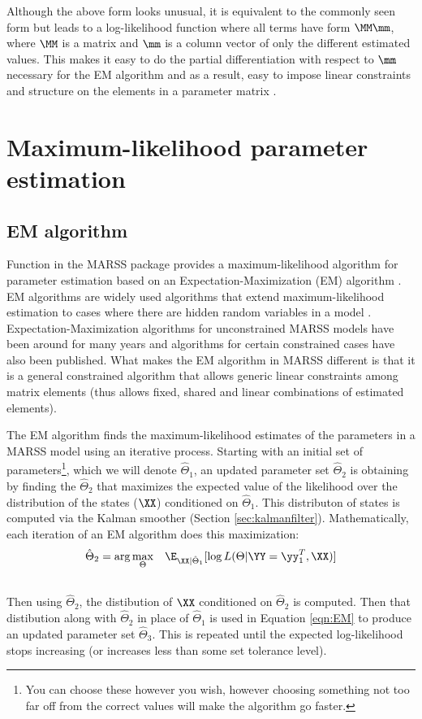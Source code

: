 Although the above form looks unusual, it is equivalent to the commonly seen form but leads to a log-likelihood function where all terms have form 
$\MM\mm$, where $\MM$ is a matrix and $\mm$ is a column vector of only the different estimated values.  This makes it easy to do the partial differentiation with respect
to $\mm$ necessary for the EM algorithm and as a result, easy to impose linear constraints and structure on the elements in a parameter matrix \citep{Holmes2010}.

\section{Maximum-likelihood parameter estimation}

\subsection{EM algorithm}

Function \verb@MARSSkem@{} in the MARSS package provides a maximum-likelihood algorithm for parameter estimation based on an Expectation-Maximization (EM) algorithm  \citep{Holmes2010}. EM algorithms are widely used algorithms that extend maximum-likelihood estimation to cases where there are hidden random variables in a model \citep{Dempsteretal1977, Harvey1989, HarveyShephard1993, McLachlanKrishnan2008}.   Expectation-Maximization algorithms for unconstrained MARSS models have been around for many years and algorithms for certain constrained cases have also been published.  What makes the EM algorithm in MARSS different is that it is a general constrained algorithm that allows generic linear constraints among matrix elements (thus allows fixed, shared and linear combinations of estimated elements). 

The EM algorithm finds the maximum-likelihood estimates of the parameters in a MARSS model using an iterative process.  Starting with an initial set of parameters\footnote{You can choose these however you wish, however choosing something not too far off from the correct values will make the algorithm go faster.}, which we will denote $\hat{\Theta}_1$, an updated parameter set $\hat{\Theta}_2$ is obtaining by finding the $\hat{\Theta}_2$ that maximizes the expected value of the likelihood over the distribution of the states ($\XX$) conditioned on $\hat{\Theta}_1$. This distributon of states is computed via the Kalman smoother (Section \ref{sec:kalmanfilter}).  Mathematically, each iteration of an EM algorithm does this maximization:
\begin{align}\label{eqn:EM}
	\hat{\Theta}_2 &= \arg\underset{\Theta}{\max} \quad \E_{\XX|\hat{\Theta}_1}[\log L(\Theta |\YY=\yy_1^T,\XX)]\\
\nonumber
\end{align}
Then using $\hat{\Theta}_2$, the distibution of $\XX$ conditioned on $\hat{\Theta}_2$ is computed.  Then that distibution along with $\hat{\Theta}_2$ in place of $\hat{\Theta}_1$ is used in Equation \eqref{eqn:EM} to produce an updated parameter set $\hat{\Theta}_3$.  This is repeated until the expected log-likelihood stops increasing (or increases less than some set tolerance level).

